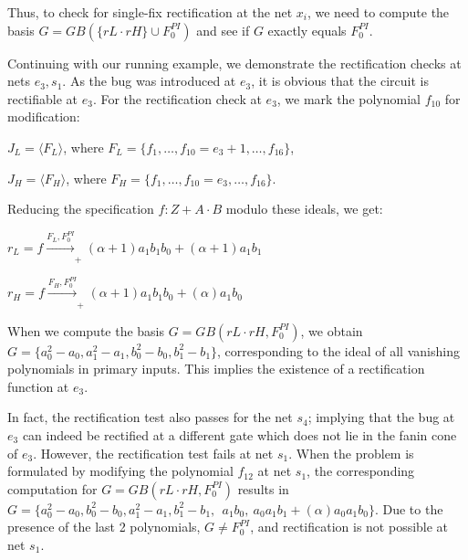 Thus, to check for single-fix rectification at the net $x_i$, we need
to compute the \Grobner basis $G = GB(\{rL\cdot rH\}\cup F_{0}^{PI})$
and see if $G$ exactly equals $F_{0}^{PI}$.  

\begin{Example}
\label{ex:3}
Continuing with our running example, we demonstrate the rectification
checks at nets $e_3, s_1$. As the bug was introduced at $e_3$, it is
obvious that the circuit is rectifiable at $e_3$. For the
rectification check at $e_3$, we mark the polynomial $f_{10}$ for
modification:

\bi
\item $J_L = \langle F_L\rangle$, where $F_L=\{f_1,\dots, f_{10}=e_3+1,\dots, f_{16}\}$,
\item $J_H = \langle F_H\rangle$, where $F_H = \{f_1,\dots, f_{10}=e_3,\dots, f_{16}\}$.
\ei

Reducing the specification $f: Z+A\cdot B$ modulo these ideals, we get:
\bi
\item $r_L = f \xrightarrow[]{F_L, F_{0}^{PI}}_+{(\alpha+1)a_1b_1b_0+(\alpha+1)a_1b_1}$
\item $r_H = f \xrightarrow[]{F_H,F_{0}^{PI}}_+{(\alpha+1)a_1b_1b_0+(\alpha)a_1b_0}$
\ei
  
When we compute the \Grobner basis $G = GB(rL\cdot rH, F_{0}^{PI})$,
we obtain $G = \{a_0^2-a_0, a_1^2-a_1,b_0^2-b_0,b_1^2-b_1\}$,
corresponding to the ideal of all vanishing polynomials in primary
inputs. This implies the existence of a rectification function at
$e_3$. 

In fact, the rectification test also passes for the net $s_4$;
implying that the bug at $e_3$ can indeed be rectified at a different
gate which does not lie in the fanin cone of $e_3$. However, the
rectification test  fails at net $s_1$. When the problem is formulated by 
modifying the polynomial $f_{12}$ at net $s_1$, the corresponding
computation for $G = GB(rL\cdot rH, F_{0}^{PI})$ results in
$G=\{a_0^2-a_0,b_0^2-b_0,a_1^2-a_1,b_1^2-b_1, ~~a_1b_0, ~a_0a_1b_1 +
(\alpha)a_0a_1b_0\}$. Due to the presence of the last 2 polynomials, 
$G \neq F_0^{PI}$, and rectification is not possible at net $s_1$. 
\end{Example}

